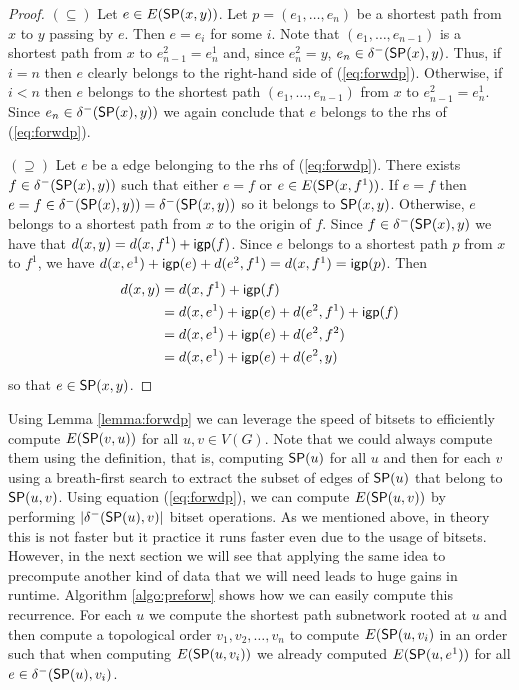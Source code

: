 \begin{proof}
$(\subseteq)$ Let $e \in E(\sp(x, y))$. Let $p = (e_1, \ldots, e_n)$ be a shortest path from $x$ to $y$ 
passing by $e$. Then $e = e_i$ for some $i$.  Note that $(e_1, \ldots, e_{n - 1})$ 
is a shortest path from $x$ to $e^2_{n - 1} = e^1_n$ and, since $e^2_n = y$, 
$e_n \in \ine(\sp(x), y)$. Thus, if $i = n$ then $e$ clearly belongs to the right-hand
side of (\ref{eq:forwdp}). Otherwise, if $i < n$ then $e$ belongs to the shortest 
path $(e_1, \ldots, e_{n - 1})$ from $x$ to $e^2_{n - 1} = e^1_n$. Since $e_n \in
\ine(\sp(x), y))$ we again conclude that $e$ belongs to the rhs of (\ref{eq:forwdp}).

$(\supseteq)$ Let $e$ be a edge belonging to the rhs of (\ref{eq:forwdp}). There exists
$f \in \ine(\sp(x), y))$ such that either $e = f$ or $e \in E(\sp(x, f^1))$. If $e = f$
then $e = f \in \ine(\sp(x), y)) = \ine(\sp(x, y))$ so it belongs to $\sp(x, y)$. Otherwise,
$e$ belongs to a shortest path from $x$ to the origin of $f$. Since $f \in \ine(\sp(x), y)$
we have that $\dist(x, y) = \dist(x, f^1) + \igp(f)$. Since $e$ belongs to a shortest
path $p$ from $x$ to $f^1$, we have 
$\dist(x, e^1) + \igp(e) + \dist(e^2, f^1) = \dist(x, f^1) = \igp(p)$.
Then
\begin{align*}
\dist(x, y) & = \dist(x, f^1) + \igp(f) \\
& = \dist(x, e^1) + \igp(e) + \dist(e^2, f^1) + \igp(f) \\
& = \dist(x, e^1) + \igp(e) + \dist(e^2, f^2) \\
& = \dist(x, e^1) + \igp(e) + \dist(e^2, y) \\
\end{align*}
so that $e \in \sp(x, y)$.
\end{proof}

Using Lemma \ref{lemma:forwdp} we can leverage the speed of bitsets to
efficiently compute $E(\SP(v, u))$ for all $u, v \in V(G)$. Note that we
could always compute them using the definition, that is, computing 
$\sp(u)$ for all $u$ and then for each $v$ using a breath-first search to
extract the subset of edges of $\sp(u)$ that belong to $\sp(u, v)$. 
Using equation (\ref{eq:forwdp}), we can compute $E(\sp(u, v))$ by
performing $|\ine(\sp(u), v)|$ bitset operations. As we mentioned above,
in theory this is not faster but it practice it runs faster even due to the
usage of bitsets. However, in the next section we will see that applying the same idea
to precompute another kind of data that we will need leads to huge gains in
runtime. Algorithm \ref{algo:preforw} shows how we can easily compute this recurrence.
For each $u$ we compute the shortest path subnetwork rooted at $u$ and then compute
a topological order $v_1, v_2, \ldots, v_n$ to compute $E(\sp(u, v_i)$ in an order such
that when computing $E(\sp(u, v_i))$ we already computed $E(\sp(u, e^1))$ for all $e \in
\ine(\sp(u), v_i)$.

